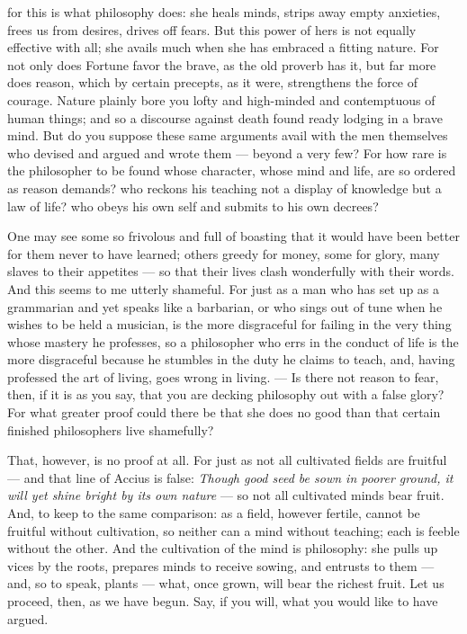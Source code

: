  for this is what philosophy does: she heals minds, strips away empty anxieties, frees us from desires, drives off fears. But this power of hers is not equally effective with all; she avails much when she has embraced a fitting nature. For not only does Fortune favor the brave, as the old proverb has it, but far more does reason, which by certain precepts, as it were, strengthens the force of courage. Nature plainly bore you lofty and high-minded and contemptuous of human things; and so a discourse against death found ready lodging in a brave mind. But do you suppose these same arguments avail with the men themselves who devised and argued and wrote them — beyond a very few? For how rare is the philosopher to be found whose character, whose mind and life, are so ordered as reason demands? who reckons his teaching not a display of knowledge but a law of life? who obeys his own self and submits to his own decrees?

 One may see some so frivolous and full of boasting that it would have been better for them never to have learned; others greedy for money, some for glory, many slaves to their appetites — so that their lives clash wonderfully with their words. And this seems to me utterly shameful. For just as a man who has set up as a grammarian and yet speaks like a barbarian, or who sings out of tune when he wishes to be held a musician, is the more disgraceful for failing in the very thing whose mastery he professes, so a philosopher who errs in the conduct of life is the more disgraceful because he stumbles in the duty he claims to teach, and, having professed the art of living, goes wrong in living. — Is there not reason to fear, then, if it is as you say, that you are decking philosophy out with a false glory? For what greater proof could there be that she does no good than that certain finished philosophers live shamefully?

 That, however, is no proof at all. For just as not all cultivated fields are fruitful — and that line of Accius is false: \textit{Though good seed be sown in poorer ground, it will yet shine bright by its own nature} — so not all cultivated minds bear fruit. And, to keep to the same comparison: as a field, however fertile, cannot be fruitful without cultivation, so neither can a mind without teaching; each is feeble without the other. And the cultivation of the mind is philosophy: she pulls up vices by the roots, prepares minds to receive sowing, and entrusts to them — and, so to speak, plants — what, once grown, will bear the richest fruit. Let us proceed, then, as we have begun. Say, if you will, what you would like to have argued.

